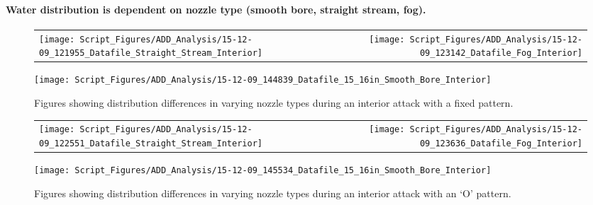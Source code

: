 \documentclass{article}
\begin{document}


\paragraph{Water distribution is dependent on nozzle type (smooth bore, straight stream, fog).} \mbox{}



\begin{figure}[ht]
\begin{tabular*}{\textwidth}{lr}
\texttt{[image: Script\_Figures/ADD\_Analysis/15-12-09\_121955\_Datafile\_Straight\_Stream\_Interior]} &
\texttt{[image: Script\_Figures/ADD\_Analysis/15-12-09\_123142\_Datafile\_Fog\_Interior]} \\
\end{tabular*}
\centering
\texttt{[image: Script\_Figures/ADD\_Analysis/15-12-09\_144839\_Datafile\_15\_16in\_Smooth\_Bore\_Interior]}
\caption{Figures showing distribution differences in varying nozzle types during an interior attack with a fixed pattern.}
\label{fig:Interior_Varying_Nozzle_Types_Fixed_Pattern}
\end{figure}

\clearpage


\begin{figure}[ht]
\begin{tabular*}{\textwidth}{lr}
\texttt{[image: Script\_Figures/ADD\_Analysis/15-12-09\_122551\_Datafile\_Straight\_Stream\_Interior]} &
\texttt{[image: Script\_Figures/ADD\_Analysis/15-12-09\_123636\_Datafile\_Fog\_Interior]} \\
\end{tabular*}
\centering
\texttt{[image: Script\_Figures/ADD\_Analysis/15-12-09\_145534\_Datafile\_15\_16in\_Smooth\_Bore\_Interior]}
\caption{Figures showing distribution differences in varying nozzle types during an interior attack with an `O' pattern.}
\label{fig:Interior_Varying_Nozzle_Types_O_Pattern}
\end{figure}
\end{document}

